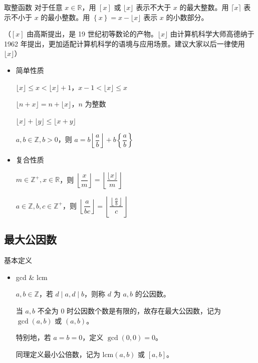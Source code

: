 \documentclass [hyperref={bookmarksdepth=4}, aspectratio=169] {beamer}
\theoremstyle {fy}
\def\Z{\mathbb{Z}}
\def\R{\mathbb{R}}
\begin{document}
\begin{frame}{取整函数}
对于任意 $x\in \R$，用 $\left[x\right]$ 或 $\lfloor x \rfloor$ 表示不大于 $x$ 的最大整数。用 $\lceil x\rceil$ 表示不小于 $x$ 的最小整数。用 $\left\{x\right\}=x-\lfloor x\rfloor$ 表示 $x$ 的小数部分。

（$\left[x\right]$ 由高斯提出，是 19 世纪初等数论的产物。$\lfloor x \rfloor$ 由计算机科学大师高德纳于 1962 年提出，更加适配计算机科学的语境与应用场景。建议大家以后一律使用 $\lfloor x\rfloor$）

\begin{itemize}
    \item 简单性质

  $\lfloor x\rfloor\le x<\lfloor x\rfloor+1$，$x-1<\lfloor x\rfloor\le x$

  $\lfloor n+x\rfloor=n+\lfloor x\rfloor$，$n$ 为整数

  $\lfloor x\rfloor+\lfloor y\rfloor\le\lfloor x+y\rfloor$

  $a,b\in\Z,b>0$，则 $a=b\left\lfloor\dfrac{a}{b}\right\rfloor+b\left\{\dfrac{a}{b}\right\}$

    \item 复合性质

  $m\in\Z^{+},x\in\R$，则 $\left\lfloor\dfrac{x}{m}\right\rfloor=\left\lfloor\dfrac{\lfloor x\rfloor}{m}\right\rfloor$

  $a\in\Z,b,c\in\Z^{+}$，则 $\left\lfloor\dfrac{a}{bc}\right\rfloor=\left\lfloor\dfrac{\left\lfloor\frac{a}{b}\right\rfloor}{c}\right\rfloor$
\end{itemize}
\end{frame}

\subsection{最大公因数}

\begin{frame}{基本定义}
\begin{itemize}
    \item gcd \& lcm

  $a,b\in \Z$，若 $d\mid a,d\mid b$，则称 $d$ 为 $a,b$ 的公因数。

  当 $a,b$ 不全为 $0$ 时公因数个数是有限的，故存在最大公因数，记为 $\gcd(a,b)$ 或 $(a,b)$。

  特别地，若 $a=b=0$，定义 $\gcd(0,0)=0$。

  同理定义最小公倍数，记为 $\mathrm{lcm}(a,b)$ 或 $\left[a,b\right]$。
\end{itemize}
\end{frame}
\end{document}
